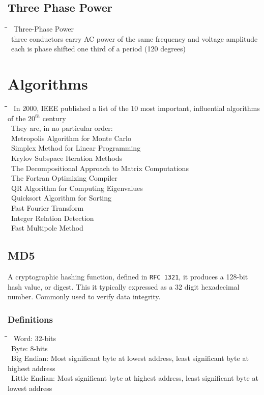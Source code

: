 \documentclass[10pt,letterpaper]{scrartcl}
\newcommand{\tbul}{\textbullet}
\newcommand{\tend}{\>\textendash}
\newcommand{\tasc}{\>\>\textasteriskcentered}
\newcommand{\tabDef}{\hspace{2em}\=\hspace{2em}\=\hspace{2em}\=\hspace{2em}\=\kill}
\begin{document}
\subsection{Three Phase Power}
\begin{tabbing}\tabDef 
\tbul\ Three-Phase Power \\
    \tend\ three conductors carry AC power of the same frequency and voltage amplitude \\
        \tasc\ each is phase shifted one third of a period (120 degrees)
\end{tabbing}

\newpage 
\section{Algorithms}
\begin{tabbing}\tabDef
\tbul\ In 2000, IEEE published a list of the 10 most important, influential algorithms of the $20^{th}$ century \\
\tbul\ They are, in no particular order: \\
	\tend\ Metropolis Algorithm for Monte Carlo \\
    \tend\ Simplex Method for Linear Programming \\
    \tend\ Krylov Subspace Iteration Methods\\
    \tend\ The Decompositional Approach to Matrix Computations \\
    \tend\ The Fortran Optimizing Compiler\\
    \tend\ QR Algorithm for Computing Eigenvalues\\
    \tend\ Quicksort Algorithm for Sorting \\
    \tend\ Fast Fourier Transform \\
    \tend\ Integer Relation Detection\\
    \tend\ Fast Multipole Method
\end{tabbing}
\subsection{MD5}
A cryptographic hashing function, defined in \texttt{RFC 1321}, it produces a 128-bit hash value, or digest. This it typically expressed as a 32 digit hexadecimal number. Commonly used to verify data integrity.
\subsubsection{Definitions}
\begin{tabbing}\tabDef
\tbul\ Word: 32-bits \\
\tbul\ Byte: 8-bits \\
\tbul\ Big Endian: Most significant byte at lowest address, least significant byte at highest address \\
\tbul\ Little Endian: Most significant byte at highest address, least significant byte at lowest address
\end{tabbing}
\end{document}
